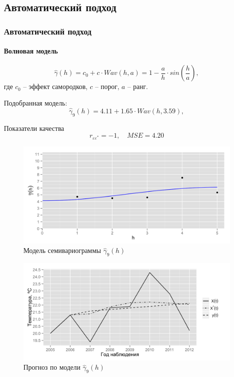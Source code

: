 \documentclass{beamer}
\begin{document}
\subsection{Автоматический подход}
\begin{frame}
  \frametitle{Автоматический подход}
  \framesubtitle{Волновая модель}
  \begin{multicols}{2}
  \begin{equation}
  \label{eq:wave}
    \widehat{\gamma}(h) = c_0 + c \cdot Wav(h, a) = 1 - \frac{a}{h} \cdot sin(\frac{h}{a}),
  \end{equation}
  где $ c_0 $ -- эффект самородков, $ c $ -- порог, $ a $ -- ранг.

  \medskip

  Подобранная модель:
  \begin{equation}
  \label{eq:gamma9}
    \widehat{\gamma}_9(h) = 4.11 + 1.65 \cdot Wav(h, 3.59),
  \end{equation}

  Показатели качества
  \begin{equation*}
    r_{\varepsilon\varepsilon^{*}} = -1, \quad MSE = 4.20
  \end{equation*}

  \columnbreak
  \vspace{-14.5pt}
  \begin{figure}[H]
    \includegraphics[width=0.9\linewidth]{../../figures/variogram/auto-rob-5-modeled.png} \\
    \caption{Модель семивариограммы $\widehat{\gamma}_9(h)$}
    \includegraphics[width=0.9\linewidth]{../../figures/variogram/auto-rob-5-cross-prediction.png}
    \caption{Прогноз по модели $\widehat{\gamma}_9(h)$}
  \end{figure}
  \end{multicols}
\end{frame}
\end{document}
